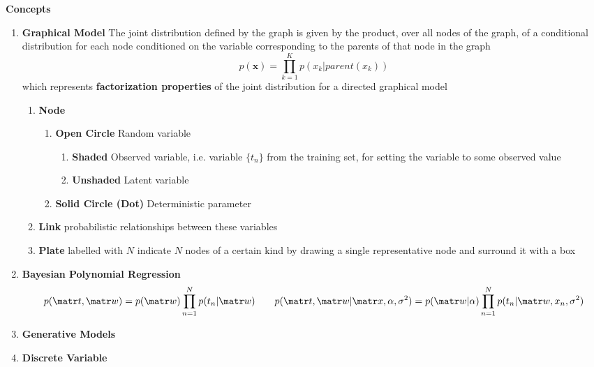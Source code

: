 \documentclass[11pt]{article}
\begin{document}
\begin{defn*}
    \textbf{Concepts}
    \begin{enumerate}
        \item \textbf{Graphical Model} The joint distribution defined by the graph is given by the product, over all nodes of the graph, of a conditional distribution for each node conditioned on the variable corresponding to the parents of that node in the graph
        \[
            p(\mathbf{x}) = \prod_{k=1}^K p(x_k | parent(x_k))
        \]
        which represents \textbf{factorization properties} of the joint distribution for a directed graphical model
        \begin{enumerate}
            \item \textbf{Node} 
            \begin{enumerate}
                \item \textbf{Open Circle} Random variable 
                \begin{enumerate}
                    \item \textbf{Shaded} Observed variable, i.e. variable $\{t_n\}$ from the training set, for setting the variable to some observed value
                    \item \textbf{Unshaded} Latent variable
                \end{enumerate}
                \item \textbf{Solid Circle (Dot)} Deterministic parameter 
            \end{enumerate}
            \item \textbf{Link} probabilistic relationships between these variables
            \item \textbf{Plate} labelled with $N$ indicate $N$ nodes of a certain kind by drawing a single representative node and surround it with a box
        \end{enumerate}
        \item \textbf{Bayesian Polynomial Regression}
        \[
            p(\bt,\bw) = p(\bw) \prod_{n=1}^N p(t_n | \bw)
            \qquad 
            p(\bt,\bw| \bx, \alpha, \sigma^2) = p(\bw|\alpha) \prod_{n=1}^N p(t_n |\bw, x_n, \sigma^2)
        \]
        \item \textbf{Generative Models}
        \item \textbf{Discrete Variable}
    \end{enumerate}
\end{defn*}
\end{document}
